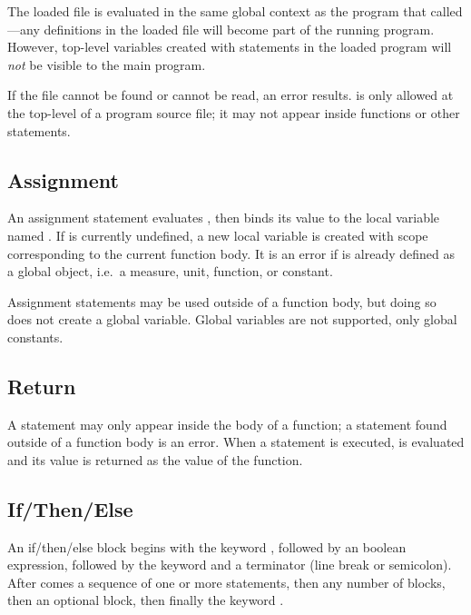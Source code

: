 The loaded file is evaluated in the same global context as the program
that called ---any definitions in the loaded file will
become part of the running program.  However, top-level variables
created with  statements in the loaded program will
\emph{not} be visible to the main program.

If the file cannot be found or cannot be read, an error results.
 is only allowed at the top-level of a program source file;
it may not appear inside functions or other statements.


\subsection{Assignment}

\begin{syntax}
 \id{} \key{=} \expr{}
\end{syntax}

An assignment statement evaluates \expr{}, then binds its value to the
local variable named \id{}.  If \id{} is currently undefined, a new
local variable is created with scope corresponding to the current
function body.  It is an error if \id{} is already defined as a global
object, i.e.\ a measure, unit, function, or constant.

Assignment statements may be used outside of a function body, but
doing so does not create a global variable.  Global variables are not
supported, only global constants.


\subsection{Return}
\label{return-stmt}

\begin{syntax}
 \expr{}
\end{syntax}

A  statement may only appear inside the body of a
function; a  statement found outside of a function body is
an error.  When a  statement is executed, \expr{} is
evaluated and its value is returned as the value of the function.



\subsection{If/Then/Else}

An if/then/else block begins with the keyword , followed by an
boolean expression, followed by the keyword  and a
terminator (line break or semicolon).  After  comes a
sequence of one or more statements, then any number of 
blocks, then an optional  block, then finally the keyword
.

